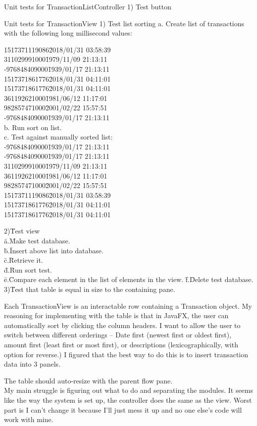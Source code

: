 \documentclass[letterpaper,12pt,oneside,titlepage,onecolumn]{article}
\begin{document}
Unit tests for TransactionListController
1)	Test button 

Unit tests for TransactionView
1)	Test list sorting
a.	Create list of transactions with the following long millisecond values:
\begin{tabbing}
1517371119086\=2018/01/31 03:58:39\\
311029991000\=1979/11/09 21:13:11\\
-976848409000\=1939/01/17 21:13:11\\
1517371861776\=2018/01/31 04:11:01\\
1517371861776\=2018/01/31 04:11:01\\
361192621000\=1981/06/12 11:17:01\\
982857471000\=2001/02/22 15:57:51\\
-976848409000\=1939/01/17 21:13:11\\
b.	Run sort on list.\\
c.	Test against manually sorted list:\\
-976848409000\=1939/01/17 21:13:11\\
-976848409000\=1939/01/17 21:13:11\\
311029991000\=1979/11/09 21:13:11\\
361192621000\=1981/06/12 11:17:01\\
982857471000\=2001/02/22 15:57:51\\
1517371119086\=2018/01/31 03:58:39\\
1517371861776\=2018/01/31 04:11:01\\
1517371861776\=2018/01/31 04:11:01\\
\end{tabbing}
\begin{tabbing}
2)\=Test view\\
\=a.\=Make test database.\\
\=b.\=Insert above list into database.\\
\=c.\=Retrieve it.\\
\=d.\=Run sort test.\\
\=e.\=Compare each element in the list of elements in the view.
\=f.\=Delete test database.\\
3)\=Test that table is equal in size to the containing pane.\\
\end{tabbing}
\par Each TransactionView is an interactable row containing a Transaction object.
My reasoning for implementing with the table is that in JavaFX, the user can automatically sort by clicking the column headers. I want to allow the  user to switch between different orderings – Date first (newest first or oldest first), amount first (least first or most first), or descriptions (lexicographically, with option for reverse.) I figured that the best way to do this is to insert transaction data into 3 panels.\par
The table should auto-resize with the parent flow pane.\\
My main struggle is figuring out what to do and separating the modules. It seems like the way the system is set up, the controller does the same as the view. Worst part is I can’t change it because I’ll just mess it up and no one else’s code will work with mine.
\end{document}
